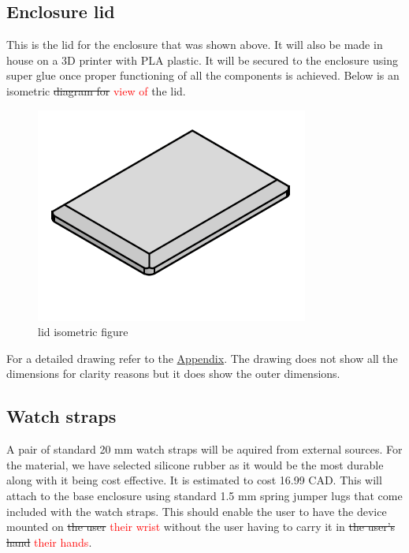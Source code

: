 \documentclass[12pt, titlepage]{article}
\begin{document}
\subsection{Enclosure lid}
This is the lid for the enclosure that was shown above. It will also be made in house on a 3D printer with PLA plastic. It will be secured to the enclosure using super glue once proper functioning of all the components is achieved. 
Below is an isometric \sout{diagram for} \textcolor{red}{view of} the lid.\\
\begin{figure}[H]
  \vspace*{-0.5cm}
  \centering
  \includegraphics[width=\textwidth,height=\textheight/2,keepaspectratio]{Lid_ISO.png}
  \vspace*{-2cm}
  \caption{lid isometric figure}
  \label{Lid ISO} 
\end{figure}
\noindent For a detailed drawing refer to the \hyperref[appendix:hardware:lidDWG]{Appendix}. The drawing does not show all the dimensions for clarity reasons but it does show the outer dimensions.

\subsection{Watch straps}
A pair of standard 20 mm watch straps will be aquired from external sources. For the material, we have selected silicone rubber as it would be the most durable along with it being cost effective. It is estimated to cost 16.99 CAD. This will attach to the base enclosure using standard 1.5 mm spring jumper lugs that come included with the watch straps. This should enable the user to have the device mounted on \sout{the user} \textcolor{red}{their wrist} without the user having to carry it in \sout{the user's hand} \textcolor{red}{their hands}.
\end{document}
